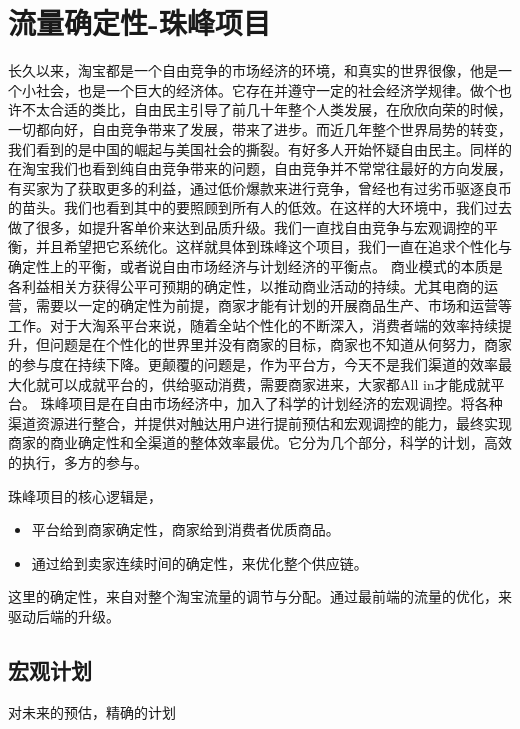 \section{流量确定性-珠峰项目}
长久以来，淘宝都是一个自由竞争的市场经济的环境，和真实的世界很像，他是一个小社会，也是一个巨大的经济体。它存在并遵守一定的社会经济学规律。做个也许不太合适的类比，自由民主引导了前几十年整个人类发展，在欣欣向荣的时候，一切都向好，自由竞争带来了发展，带来了进步。而近几年整个世界局势的转变，我们看到的是中国的崛起与美国社会的撕裂。有好多人开始怀疑自由民主。同样的在淘宝我们也看到纯自由竞争带来的问题，自由竞争并不常常往最好的方向发展，有买家为了获取更多的利益，通过低价爆款来进行竞争，曾经也有过劣币驱逐良币的苗头。我们也看到其中的要照顾到所有人的低效。在这样的大环境中，我们过去做了很多，如提升客单价来达到品质升级。我们一直找自由竞争与宏观调控的平衡，并且希望把它系统化。这样就具体到珠峰这个项目，我们一直在追求个性化与确定性上的平衡，或者说自由市场经济与计划经济的平衡点。
\newline 商业模式的本质是各利益相关方获得公平可预期的确定性，以推动商业活动的持续。尤其电商的运营，需要以一定的确定性为前提，商家才能有计划的开展商品生产、市场和运营等工作。对于大淘系平台来说，随着全站个性化的不断深入，消费者端的效率持续提升，但问题是在个性化的世界里并没有商家的目标，商家也不知道从何努力，商家的参与度在持续下降。更颠覆的问题是，作为平台方，今天不是我们渠道的效率最大化就可以成就平台的，供给驱动消费，需要商家进来，大家都All in才能成就平台。
\newline 珠峰项目是在自由市场经济中，加入了科学的计划经济的宏观调控。将各种渠道资源进行整合，并提供对触达用户进行提前预估和宏观调控的能力，最终实现商家的商业确定性和全渠道的整体效率最优。它分为几个部分，科学的计划，高效的执行，多方的参与。

珠峰项目的核心逻辑是，
\begin{itemize}
\item 平台给到商家确定性，商家给到消费者优质商品。
\item 通过给到卖家连续时间的确定性，来优化整个供应链。
\end{itemize}
这里的确定性，来自对整个淘宝流量的调节与分配。通过最前端的流量的优化，来驱动后端的升级。

\subsection{宏观计划}
对未来的预估，精确的计划

